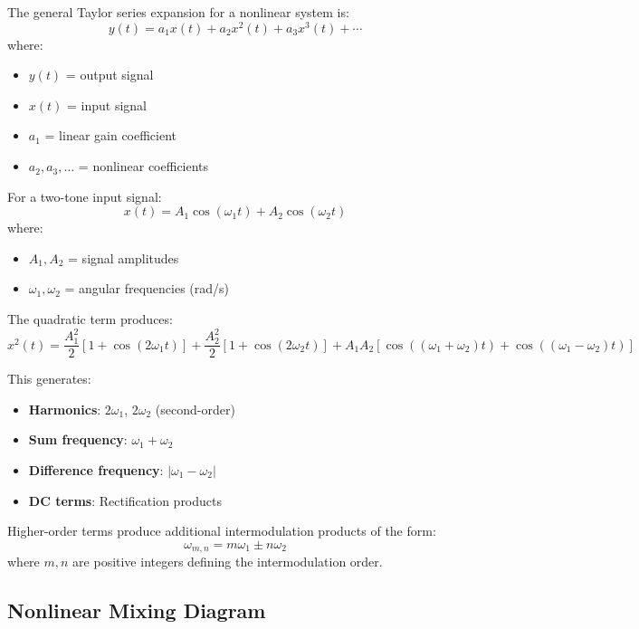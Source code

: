 The general Taylor series expansion for a nonlinear system is:
\begin{equation}
\label{eq:nonlinear-series}
y(t) = a_1 x(t) + a_2 x^2(t) + a_3 x^3(t) + \cdots
\end{equation}
where:
\begin{itemize}
\item $y(t)$ = output signal
\item $x(t)$ = input signal
\item $a_1$ = linear gain coefficient
\item $a_2, a_3, \ldots$ = nonlinear coefficients
\end{itemize}

For a two-tone input signal:
\begin{equation}
\label{eq:two-tone-input}
x(t) = A_1 \cos(\omega_1 t) + A_2 \cos(\omega_2 t)
\end{equation}
where:
\begin{itemize}
\item $A_1, A_2$ = signal amplitudes
\item $\omega_1, \omega_2$ = angular frequencies (rad/s)
\end{itemize}

The quadratic term produces:
\begin{equation}
\label{eq:quadratic-mixing}
x^2(t) = \frac{A_1^2}{2}[1 + \cos(2\omega_1 t)] + \frac{A_2^2}{2}[1 + \cos(2\omega_2 t)] + A_1 A_2[\cos((\omega_1+\omega_2)t) + \cos((\omega_1-\omega_2)t)]
\end{equation}

This generates:
\begin{itemize}
\item \textbf{Harmonics}: $2\omega_1$, $2\omega_2$ (second-order)
\item \textbf{Sum frequency}: $\omega_1 + \omega_2$
\item \textbf{Difference frequency}: $|\omega_1 - \omega_2|$
\item \textbf{DC terms}: Rectification products
\end{itemize}

Higher-order terms produce additional intermodulation products of the form:
\begin{equation}
\label{eq:imd-products}
\omega_{m,n} = m\omega_1 \pm n\omega_2
\end{equation}
where $m, n$ are positive integers defining the intermodulation order.

\subsection{Nonlinear Mixing Diagram}


